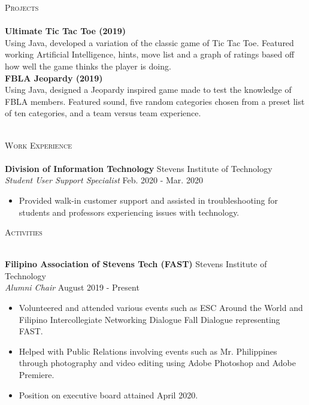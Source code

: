 \documentclass[10pt]{article}
\newcommand{\lineunder} {
    \vspace*{-8pt} \\
    \hspace*{-18pt} \hrulefill \\
}
\newcommand{\header} [1] {
    {\hspace*{-18pt}\vspace*{6pt} \textsc{#1}}
    \vspace*{-6pt} \lineunder
}
\begin{document}
\header{Projects}
{\textbf{Ultimate Tic Tac Toe (2019)}} \hfill 
\\
Using Java, developed a variation of the classic game of Tic Tac Toe. Featured working Artificial Intelligence, hints, move list and a graph of ratings based off how well the game thinks the player is doing.\\
\vspace*{2mm}
{\textbf{FBLA Jeopardy (2019)}} \hfill 
\\
Using Java, designed a Jeopardy inspired game made to test the knowledge of FBLA members. Featured sound, five random categories chosen from a preset list of ten categories, and a team versus team experience.\\
\vspace*{2mm}
\ 
\header{Work Experience}
\vspace{1mm}
\textbf{Division of Information Technology} \hfill Stevens Institute of Technology\\
\textit{Student User Support Specialist} \hfill Feb. 2020 - Mar. 2020\\
\vspace{-1mm}
\begin{itemize} \itemsep 1pt
	\item Provided walk-in customer support and assisted in troubleshooting for students and professors experiencing issues with technology.
\end{itemize}

\header{Activities}
\vspace{1mm}

\textbf{Filipino Association of Stevens Tech (FAST)} \hfill Stevens Institute of Technology\\
\textit{Alumni Chair} \hfill August 2019 - Present\\
\vspace{-1mm}
\begin{itemize} \itemsep 1pt
	\item Volunteered and attended various events such as ESC Around the World and Filipino Intercollegiate Networking Dialogue Fall Dialogue representing FAST.
	\item Helped with Public Relations involving events such as Mr. Philippines through photography and video editing using Adobe Photoshop and Adobe Premiere.
	\item Position on executive board attained April 2020.
\end{itemize}
\end{document}
